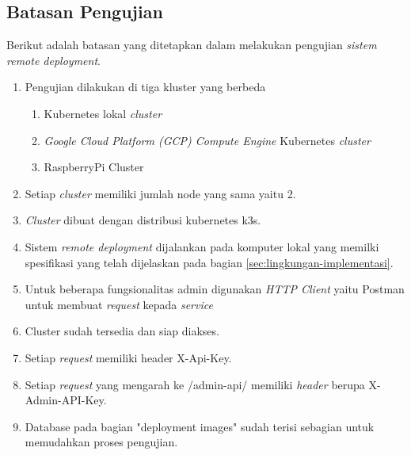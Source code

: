 \subsection{Batasan Pengujian}
\label{subsec:batasan-pengujian}
Berikut adalah batasan yang ditetapkan dalam melakukan pengujian \textit{sistem remote deployment}.

\begin{enumerate}
  \item Pengujian dilakukan di tiga kluster yang berbeda
        \begin{enumerate}
          \item Kubernetes lokal \textit{cluster}
          \item \textit{Google Cloud Platform (GCP) Compute Engine} Kubernetes \textit{cluster}
          \item RaspberryPi Cluster
        \end{enumerate}
  \item Setiap \textit{cluster} memiliki jumlah node yang sama yaitu 2.
  \item \textit{Cluster} dibuat dengan distribusi kubernetes k3s.
  \item Sistem \textit{remote deployment} dijalankan pada komputer lokal yang memilki spesifikasi yang telah dijelaskan pada bagian \ref{sec:lingkungan-implementasi}.
  \item Untuk beberapa fungsionalitas admin digunakan \textit{HTTP Client} yaitu Postman untuk membuat \textit{request} kepada \textit{service}
  \item Cluster sudah tersedia dan siap diakses.
  \item Setiap \textit{request} memiliki header X-Api-Key.
  \item Setiap \textit{request} yang mengarah ke /admin-api/ memiliki \textit{header} berupa X-Admin-API-Key.
  \item Database pada bagian "deployment images" sudah terisi sebagian untuk memudahkan proses pengujian.
\end{enumerate}